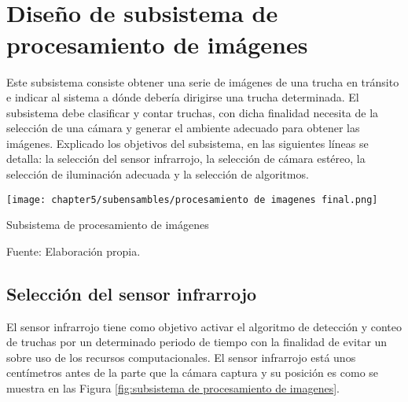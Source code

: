 \chapter[\quad\quad\quad\quad ----- Diseño de subsistema de procesamiento de imágenes]{\\ Diseño de subsistema de procesamiento de imágenes}
\thispagestyle{myportland}

Este subsistema consiste obtener una serie de imágenes de una trucha en tránsito e indicar al sistema a dónde debería dirigirse una trucha determinada. El subsistema debe clasificar y contar truchas, con dicha finalidad necesita de la selección de una cámara y generar el ambiente adecuado para obtener las imágenes. Explicado los objetivos del subsistema, en las siguientes líneas se detalla: la selección del sensor infrarrojo, la selección de cámara estéreo, la selección de iluminación adecuada y la selección de algoritmos.

\begin{myfigure}[H]
	\footnotesize\centering
	\texttt{[image: chapter5/subensambles/procesamiento de imagenes final.png]}
	\caption{Subsistema de procesamiento de imágenes}
	\begin{myflushcenter}
		Fuente: Elaboración propia.
	\end{myflushcenter}
	\label{fig:subsistema de procesamiento de imagenes}
\end{myfigure}
 
\section{Selección del sensor infrarrojo}

El sensor infrarrojo tiene como objetivo activar el algoritmo de detección y conteo de truchas por un determinado periodo de tiempo con la finalidad de evitar un sobre uso de los recursos computacionales. El sensor infrarrojo está unos centímetros antes de la parte que la cámara captura y su posición es como se muestra en las Figura \ref{fig:subsistema de procesamiento de imagenes}.


